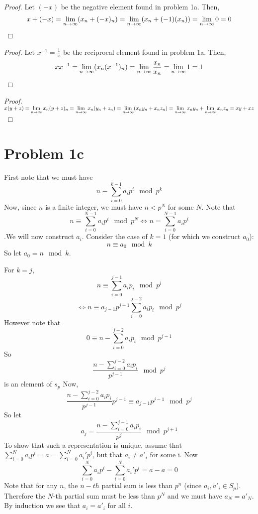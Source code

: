 \begin{proof}
Let $(-x)$ be the negative element found in problem 1a. Then,
\[x+(-x) = \lim\limits_{n\to\infty} (x_n + (-x)_n) = \lim\limits_{n\to\infty} (x_n + (-1)(x_n)) = \lim\limits_{n\to\infty} 0 = 0 \]
\end{proof}
\begin{proof}
Let $x^{-1}=\frac{1}{x}$ be the reciprocal element found in problem 1a. Then,
\[xx^{-1} = \lim\limits_{n\to\infty} (x_n(x^{-1})_n) = \lim\limits_{n\to\infty} \frac{x_n}{x_n} = \lim\limits_{n\to\infty} 1 = 1 \]
\end{proof}
\begin{proof}
$ x(y+z) = \lim\limits_{n\to\infty} x_n(y+z)_n = \lim\limits_{n\to\infty} x_n(y_n+z_n) = \lim\limits_{n\to\infty} (x_ny_n + x_nz_n) = \lim\limits_{n\to\infty} x_ny_n + \lim\limits_{n\to\infty} x_nz_n = xy + xz$
\end{proof}
\section*{Problem 1c}
First note that we must have 
\[ n \equiv \sum\limits_{i=0}^{k-1} a_i p^i \mod{p^k} \]
Now, since $n$ is a finite integer, we must have $n<p^N$ for some $N$. Note that
\[ n \equiv \sum\limits_{i=0}^{N-1} a_i p^i \mod{p^N} \Leftrightarrow n = \sum\limits_{i=0}^{N-1} a_i p^i  \]
.We will now construct $a_i$. Consider the case of $k=1$ (for which we construct $a_0$):
\[ n \equiv a_0 \mod{k}\]
So let $a_0 = n \mod{k}$. \par For $k=j$,
\[ n \equiv \sum\limits_{i=0}^{j-1} a_i p_i \mod{p^i} \]
\[ \Leftrightarrow  n \equiv a_{j-1}p^{j-1}\sum\limits_{i=0}^{j-2} a_i p_i \mod{p^j} \]
However note that 
\[ 0 \equiv n- \sum\limits_{i=0}^{j-2} a_i p_i \mod{p^{j-1}} \]
So 
\[\dfrac{n- \sum\limits_{i=0}^{j-2} a_i p_i }{p^{j-1}} \mod{p^j} \] is an element of $s_p$
Now, 
\[ \dfrac{n- \sum\limits_{i=0}^{j-2} a_i p_i }{p^{j-1}} p^{j-1}\equiv a_{j-1}p^{j-1} \mod{p^j}  \]
So let 
\[a_{j} = \dfrac{n- \sum\limits_{i=0}^{j-1} a_i p_i }{p^{j}} \mod{p^{j+1}} \]
To show that such a representation is unique, assume that $\sum _{i=0}^N a_ip^i = a = \sum _{i=0}^N a_i'p^i$, but that $a_i\neq a'_i$ for some i.
Now
\[ \sum _{i=0}^N a_ip^i  - \sum _{i=0}^N a_i'p^i = a-a = 0 \]
Note that for any $n$, the $n-th$ partial sum is less than $p^n$ (since $a_i, a'_i \in S_p$). Therefore the $N$-th partial sum must be less than $p^N$ and we must have $a_N=a'_N$. By induction we see that $a_i = a'_i$ for all $i$.
